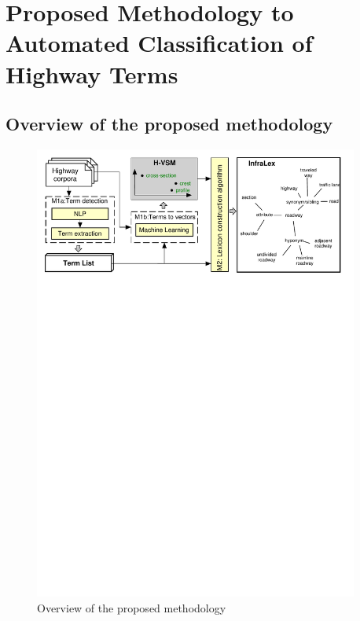 \documentclass[Journal, BackFigs, DoubleSpace]{ascelike}%
\begin{document}
\section{Proposed Methodology to Automated Classification of Highway Terms} \label{sec:RoadLex}
\subsection{Overview of the proposed methodology} \label{sec:proposed_method} %
%
\begin{figure}[t]
	\centering
	\includegraphics[width=0.95\textwidth]{Figure1_overview_methodology}
	\caption{Overview of the proposed methodology}
	\label{fig:framework}
\end{figure}
%
\end{document}
